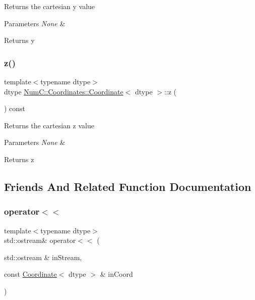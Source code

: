 Returns the cartesian y value


\begin{DoxyParams}{Parameters}
{\em None} & \\
\hline
\end{DoxyParams}
\begin{DoxyReturn}{Returns}
y 
\end{DoxyReturn}
\mbox{\label{class_num_c_1_1_coordinates_1_1_coordinate_af7152f284ec30a7dd057b8e1d6cd2176}} 
\subsubsection{\texorpdfstring{z()}{z()}}
{\footnotesize\ttfamily template$<$typename dtype$>$ \\
dtype \mbox{\hyperlink{class_num_c_1_1_coordinates_1_1_coordinate}{Num\+C\+::\+Coordinates\+::\+Coordinate}}$<$ dtype $>$\+::z (\begin{DoxyParamCaption}{ }\end{DoxyParamCaption}) const\hspace{0.3cm}{\ttfamily [inline]}}

Returns the cartesian z value


\begin{DoxyParams}{Parameters}
{\em None} & \\
\hline
\end{DoxyParams}
\begin{DoxyReturn}{Returns}
z 
\end{DoxyReturn}


\subsection{Friends And Related Function Documentation}
\mbox{\label{class_num_c_1_1_coordinates_1_1_coordinate_aa5a56295ef46edb54bf7fdafb169c081}} 
\subsubsection{\texorpdfstring{operator$<$$<$}{operator<<}}
{\footnotesize\ttfamily template$<$typename dtype$>$ \\
std\+::ostream\& operator$<$$<$ (\begin{DoxyParamCaption}\item[{std\+::ostream \&}]{in\+Stream,  }\item[{const \mbox{\hyperlink{class_num_c_1_1_coordinates_1_1_coordinate}{Coordinate}}$<$ dtype $>$ \&}]{in\+Coord }\end{DoxyParamCaption})\hspace{0.3cm}{\ttfamily [friend]}}

